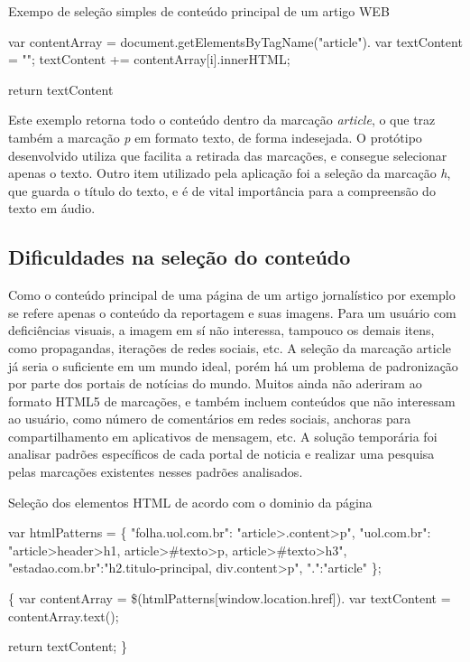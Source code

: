 \documentclass[
	12pt,				%
	oneside,			%
	a4paper,			%
	english,			%
	brazil				%
	]{abntex2ppgsi}
\begin{document}
\begin{algorithm}[htbp]
	\caption{Exempo de seleção simples de conteúdo principal de um artigo WEB}
	\label{alg:algoritmo-exemplo3}
	\begin{algorithmic}
		\State var contentArray = document.getElementsByTagName("article").
		\State var textContent = "";
		\State	textContent += contentArray[i].innerHTML;
		\EndFor
		
		\Return return textContent
		\EndFunction
	\end{algorithmic}
\end{algorithm}

Este exemplo retorna todo o conteúdo dentro da marcação \textit{article}, o que traz também a marcação \textit{p} em formato texto, de forma indesejada. O protótipo desenvolvido utiliza  que facilita a retirada das marcações, e consegue selecionar apenas o texto. Outro item utilizado pela aplicação foi a seleção da marcação \textit{h}, que guarda o título do texto, e é de vital importância para a compreensão do texto em áudio. 

\subsection{Dificuldades na seleção do conteúdo}

Como o conteúdo principal de uma página de um artigo jornalístico por exemplo se refere apenas o conteúdo da reportagem e suas imagens. Para um usuário com deficiências visuais, a imagem em sí não interessa, tampouco os demais itens, como propagandas, iterações de redes sociais, etc. A seleção da marcação article já seria o suficiente em um mundo ideal, porém há um problema de padronização por parte dos portais de notícias do mundo. Muitos ainda não aderiram ao formato HTML5 de marcações, e também incluem conteúdos que não interessam ao usuário, como número de comentários em redes sociais, anchoras para compartilhamento em aplicativos de mensagem, etc. A solução temporária foi analisar padrões específicos de cada portal de noticia e realizar uma pesquisa pelas marcações existentes nesses padrões analisados. 

\begin{algorithm}[htbp]
\caption{Seleção dos elementos HTML de acordo com o dominio da página}
	\label{alg:algoritmo-exemplo4}
	\begin{algorithmic}
		\State var htmlPatterns = \{
		\State	"folha.uol.com.br": "article\textgreater .content\textgreater p",
		\State	"uol.com.br": "article\textgreater header\textgreater h1, article\textgreater\#texto\textgreater p, article\textgreater\#texto\textgreater h3",
		\State	"estadao.com.br":"h2.titulo-principal, div.content\textgreater p",
		\State	".":"article"
		\State \}; 
	
		\Function{SelecionarConteudo}{} \{
		\State var contentArray = \$(htmlPatterns[window.location.href]).
		\State var textContent = contentArray.text();
		
		\Return return textContent;
		\EndFunction
		\}
	\end{algorithmic}
\end{algorithm}
\end{document}
